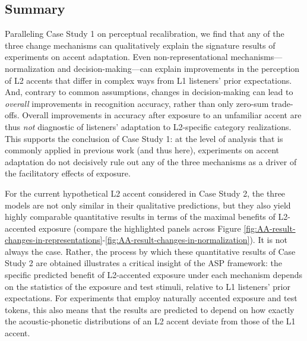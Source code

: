 \documentclass[
  11pt,
  english,
  man,floatsintext]{apa6}
\begin{document}
\hypertarget{summary-1}{%
\subsection{Summary}\label{summary-1}}

Paralleling Case Study 1 on perceptual recalibration, we find that any of the three change mechanisms can qualitatively explain the signature results of experiments on accent adaptation. Even non-representational mechanisms---normalization and decision-making---can explain improvements in the perception of L2 accents that differ in complex ways from L1 listeners' prior expectations. And, contrary to common assumptions, changes in decision-making can lead to \emph{overall} improvements in recognition accuracy, rather than only zero-sum trade-offs. Overall improvements in accuracy after exposure to an unfamiliar accent are thus \emph{not} diagnostic of listeners' adaptation to L2-specific category realizations. This supports the conclusion of Case Study 1: at the level of analysis that is commonly applied in previous work (and thus here), experiments on accent adaptation do not decisively rule out any of the three mechanisms as a driver of the facilitatory effects of exposure.

For the current hypothetical L2 accent considered in Case Study 2, the three models are not only similar in their qualitative predictions, but they also yield highly comparable quantitative results in terms of the maximal benefits of L2-accented exposure (compare the highlighted panels across Figure \ref{fig:AA-result-changes-in-representations}-\ref{fig:AA-result-changes-in-normalization}). It is not always the case. Rather, the process by which these quantitative results of Case Study 2 are obtained illustrates a critical insight of the ASP framework: the specific predicted benefit of L2-accented exposure under each mechanism depends on the statistics of the exposure and test stimuli, relative to L1 listeners' prior expectations. For experiments that employ naturally accented exposure and test tokens, this also means that the results are predicted to depend on how exactly the acoustic-phonetic distributions of an L2 accent deviate from those of the L1 accent.
\end{document}
